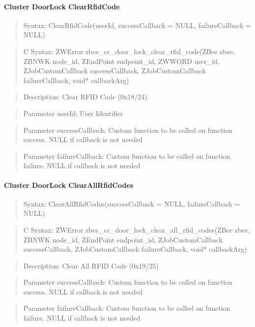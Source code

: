 \paragraph{Cluster DoorLock ClearRfidCode}
\begin{quote}Syntax: ClearRfidCode(userId, successCallback = NULL, failureCallback = NULL)\end{quote}
\begin{quote}C Syntax: ZWError zbee\_cc\_door\_lock\_clear\_rfid\_code(ZBee zbee, ZBNWK node\_id, ZEndPoint endpoint\_id, ZWWORD user\_id, ZJobCustomCallback successCallback, ZJobCustomCallback failureCallback, void* callbackArg)\end{quote}
\begin{quote}Description: Clear RFID Code (0x18/24)\end{quote}
\begin{quote}Parameter userId: User Identifier\end{quote}
\begin{quote}Parameter successCallback: Custom function to be called on function success. NULL if callback is not needed\end{quote}
\begin{quote}Parameter failureCallback: Custom function to be called on function failure. NULL if callback is not needed\end{quote}


\paragraph{Cluster DoorLock ClearAllRfidCodes}
\begin{quote}Syntax: ClearAllRfidCodes(successCallback = NULL, failureCallback = NULL)\end{quote}
\begin{quote}C Syntax: ZWError zbee\_cc\_door\_lock\_clear\_all\_rfid\_codes(ZBee zbee, ZBNWK node\_id, ZEndPoint endpoint\_id, ZJobCustomCallback successCallback, ZJobCustomCallback failureCallback, void* callbackArg)\end{quote}
\begin{quote}Description: Clear All RFID Code (0x19/25)\end{quote}
\begin{quote}Parameter successCallback: Custom function to be called on function success. NULL if callback is not needed\end{quote}
\begin{quote}Parameter failureCallback: Custom function to be called on function failure. NULL if callback is not needed\end{quote}



